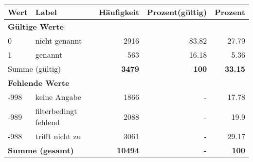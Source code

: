      \begin{longtable}{lXrrr}
     \toprule
     \textbf{Wert} & \textbf{Label} & \textbf{Häufigkeit} & \textbf{Prozent(gültig)} & \textbf{Prozent} \\
     \endhead
     \midrule
     \multicolumn{5}{l}{\textbf{Gültige Werte}}\\

     0 &
     \multicolumn{1}{X}{ nicht genannt   } &


       \num{2916} &
       \num[round-mode=places,round-precision=2]{83.82} &
         \num[round-mode=places,round-precision=2]{27.79} \\

     1 &
     \multicolumn{1}{X}{ genannt   } &


       \num{563} &
       \num[round-mode=places,round-precision=2]{16.18} &
         \num[round-mode=places,round-precision=2]{5.36} \\
     \midrule
     \multicolumn{2}{l}{Summe (gültig)} &
       \textbf{\num{3479}} &
     \textbf{\num{100}} &
       \textbf{\num[round-mode=places,round-precision=2]{33.15}} \\
     \multicolumn{5}{l}{\textbf{Fehlende Werte}}\\
       -998 &
       keine Angabe &
         \num{1866} &
        - &
         \num[round-mode=places,round-precision=2]{17.78} \\
       -989 &
       filterbedingt fehlend &
         \num{2088} &
        - &
         \num[round-mode=places,round-precision=2]{19.9} \\
       -988 &
       trifft nicht zu &
         \num{3061} &
        - &
         \num[round-mode=places,round-precision=2]{29.17} \\
     \midrule
     \multicolumn{2}{l}{\textbf{Summe (gesamt)}} &
          \textbf{\num{10494}} &
        \textbf{-} &
        \textbf{\num{100}} \\
     \bottomrule
     \end{longtable}
     
